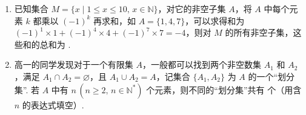 \documentclass[a4paper,11pt]{article}
\begin{document}
\begin{enumerate}
\fi
\item 已知集合 $M=\{x\mid 1\leqslant x\leqslant 10,\,x\in\mathbb{N}\}$，对它的非空子集 $A$，将 $A$ 中每个元素 $k$ 都乘以 $(-1)^k$ 再求和，如 $A=\{1,4,7\}$，可以求得和为 $(-1)^1\times 1+(-1)^4\times 4+(-1)^7\times 7=-4$，则对 $M$ 的所有非空子集，这些和的总和为 \blankline[2em].


\ifanswer
\solbegin
{}
\solend

\fi
\item 高一的同学发现对于一个有限集 $A$，一般都可以找到两个非空数集 $A_1$ 和 $A_2$，满足 $A_1\cap A_2=\varnothing$，且 $A_1\cup A_2=A$，记集合 $\{A_1,A_2\}$ 为 $A$ 的一个“划分集”. 若 $A$ 中有 $n\,(n\geqslant 2,\,n\in\mathbb{N}^*)$ 个元素，则不同的“划分集”共有 \blankline 个（用含 $n$ 的表达式填空）.


\ifanswer
\solbegin
{}
\solend

\fi
\end{enumerate}

\end{document}
